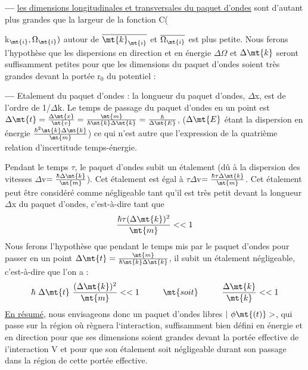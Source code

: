 {{{\bf—} \ul{les dimensions longitudinales et transversales du paquet d'ondes} sont
d'autant plus grandes que la largeur de la fonction C({k$_\mt{i},\Omega_\mt{i})$ autour de
$\overline{\mt{k}_\mt{i}}$ et $\overline{\Omega_\mt{i}}$ est plus petite. Nous ferons l'hypothèse que les dispersions en
direction et en énergie $\Delta\Omega$ et $\Delta\mt{k}$ seront suffisamment petites pour que les
dimensions du paquet d'ondes soient très grandes devant la portée r$_0$ du
potentiel :\begin{center}
 \end{center}

{\bf—} Etalement du paquet d'ondes : la longueur du paquet d'ondes, $\Delta$x, est
de l'ordre de 1/$\Delta$k. Le temps de passage du paquet d'ondes en un point
est $\Delta\mt{t}=\frac{\Delta\mt{x}}{\mt{v}}=\frac{\mt{m}}{\hbar\mt{k}\Delta\mt{k}}=\frac{\hbar}{\Delta\mt{E}}$,
($\Delta\mt{E}$ étant la dispersion en énergie $\frac{\hbar^2\mt{k}\Delta\mt{k}}{\mt{m}}$)
ce qui n'est autre que l'expression de la quatrième relation d'incertitude
temps-énergie.

Pendant le temps $\tau$, le paquet d'ondes subit un étalement (dû à
la dispersion des vitesses $\Delta$v$=\frac{\hbar\Delta\mt{k}}{\mt{m}}$). Cet étalement est égal à
$\tau\Delta$v$=\frac{\hbar\tau\Delta\mt{k}}{\mt{m}}$.
Cet étalement peut être considéré comme négligeable tant
qu'il est très petit devant la longueur $\Delta$x du paquet d'ondes, c'est-à-dire tant que
\[
\frac{\hbar\tau(\Delta\mt{k})^2}{\mt{m}}<<1
\]
Nous ferons l'hypothèse que pendant le temps mis par le paquet d'ondes
pour passer en un point $\Delta\mt{t}=\frac{\mt{m}}{\hbar\mt{k}\Delta\mt{k}}$, il subit un étalement négligeable,
c'est-à-dire que l'on a :
\[
\hbar\ \Delta\mt{t}\ \frac{(\Delta\mt{k})^2}{\mt{m}}<<1 \hspace{1cm} \mt{soit} \hspace{1cm} \frac{\Delta\mt{k}}{\mt{k}}<<1
\]
\ul{En résumé}, nous envisageons donc un paquet d'ondes libres $|\ \phi\mt{(t)}>$, qui
passe sur la région où règnera l‘interaction, suffisamment bien défini en
énergie et en direction pour que ses dimensions soient grandes devant la
portée effective de i'interaction V et pour que son étalement soit négligeable
durant son passage dans la région de cette portée effective.
}}}
